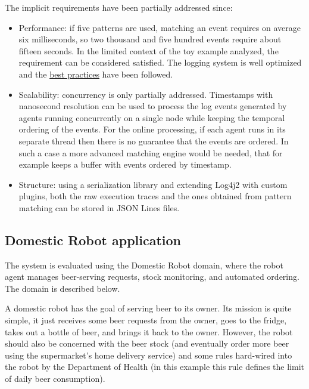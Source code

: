 \documentclass{scrartcl}
\begin{document}
The implicit requirements have been partially addressed since:

\begin{itemize}
    \item Performance: if five patterns are used, matching an event requires on average six milliseconds, so two thousand and five hundred events require about fifteen seconds. In the limited context of the toy example analyzed, the requirement can be considered satisfied. The logging system is well optimized and the \href{https://logging.apache.org/log4j/2.x/manual/performance.html}{best practices}  have been followed.
    \item Scalability: concurrency is only partially addressed. Timestamps with nanosecond resolution can be used to process the log events generated by agents running concurrently on a single node  while keeping the temporal ordering of the events. For the online processing, if each agent runs in its separate thread then there is no guarantee that the events are ordered. In such a case a more advanced matching engine would be needed, that for example keeps a buffer with events ordered by timestamp.
    \item Structure: using a serialization library and extending Log4j2 with custom plugins, both the raw execution traces and the ones obtained from pattern matching can be stored in JSON Lines files.
\end{itemize}

\subsection{Domestic Robot application}

The system is evaluated using the Domestic Robot domain, where the robot agent manages beer-serving requests, stock monitoring, and automated ordering. The domain is described below.

\begin{displayquote}
A domestic robot has the goal of serving beer to its owner. Its mission is
quite simple, it just receives some beer requests from the owner, goes to the
fridge, takes out a bottle of beer, and brings it back to the owner.
However, the robot should also be concerned with the beer stock (and eventually
order more beer using the supermarket’s home delivery service) and some rules
hard-wired into the robot by the Department of Health (in this example this
rule defines the limit of daily beer consumption).
\end{displayquote}
\end{document}
